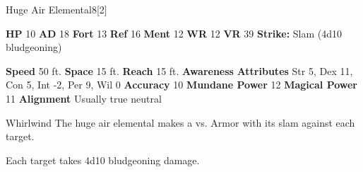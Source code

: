   \begin{monsubsection}{Huge Air Elemental}{8}[2]
    \vspace{-1em}\vspace{-1em}
    \vspace{0em}

    
    

    \begin{spellcontent}
      \begin{spelltargetinginfo}
        \pari \textbf{HP} 10 \monsep
          \textbf{AD} 18 \monsep
          \textbf{Fort} 13 \monsep
          \textbf{Ref} 16 \monsep
          \textbf{Ment} 12
        \pari \textbf{WR} 12 \monsep
        \textbf{VR} 39
        \pari \textbf{Strike:}
            Slam  (4d10 bludgeoning)
      \end{spelltargetinginfo}
    \end{spellcontent}
    \begin{monsterfooter}
      \pari \textbf{Speed} 50 ft. \monsep
        \textbf{Space} 15 ft. \monsep
        \textbf{Reach} 15 ft.
      \pari \textbf{Awareness} 
      \pari \textbf{Attributes}
        Str 5, Dex 11,
        Con 5, Int -2,
        Per 9, Wil 0
      \pari \textbf{Accuracy} 10 \monsep
        \textbf{Mundane Power} 12 \monsep
      \textbf{Magical Power} 11
      \pari \textbf{Alignment} Usually true neutral
    \end{monsterfooter}
  \end{monsubsection}
  \begin{freeability}{Whirlwind}
       The huge air elemental makes a 
         vs. Armor
        with its slam against each target.
    
    \hit Each target takes 4d10 bludgeoning damage.
    \end{freeability}
  

